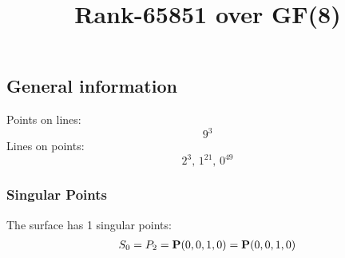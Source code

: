 \documentclass{article}
\newcommand\setTBstruts{\def\T{\rule{0pt}{2.6ex}}%
\def\B{\rule[-1.2ex]{0pt}{0pt}}}
\newcommand{\bP}{{\bf P}}
\begin{document}
 
\setTBstruts



{\allowdisplaybreaks%






\title{Rank-65851 over GF(8)}
\author{}%
\maketitle%
%
{}



\subsection*{General information}
Points on lines:
$$
9^3$$
Lines on points:
$$
2^3,\,1^{21},\,0^{49}$$
\subsubsection*{Singular Points}
The surface has 1 singular points:\\
\begin{align*}
S_{0} &= P_{2}=\bP(0, 0, 1, 0) = \bP(0, 0, 1, 0)\\
\end{align*}
}
\end{document}
